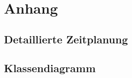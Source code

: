 \section{Anhang}

\subsection{Detaillierte Zeitplanung}
\label{app:Zeitplanung}


\clearpage






\clearpage


\clearpage


%

\subsection{Klassendiagramm}
\label{app:Klassendiagramm}




